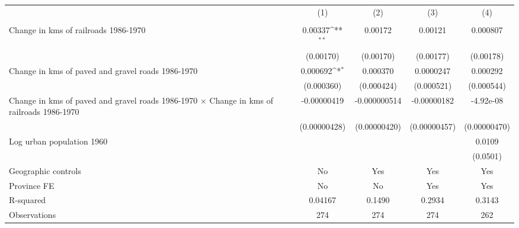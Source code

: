 {
\def\sym#1{\ifmmode^{#1}\else\(^{#1}\)\fi}
\begin{tabular}{l*{4}{c}}
\hline\hline
                &\multicolumn{1}{c}{(1)}&\multicolumn{1}{c}{(2)}&\multicolumn{1}{c}{(3)}&\multicolumn{1}{c}{(4)}\\
                &\multicolumn{1}{c}{}&\multicolumn{1}{c}{}&\multicolumn{1}{c}{}&\multicolumn{1}{c}{}\\
\hline
Change in kms of railroads 1986-1970&  0.00337\sym{**} &  0.00172         &  0.00121         & 0.000807         \\
                &(0.00170)         &(0.00170)         &(0.00177)         &(0.00178)         \\
[1em]
Change in kms of paved and gravel roads 1986-1970& 0.000692\sym{*}  & 0.000370         &0.0000247         & 0.000292         \\
                &(0.000360)         &(0.000424)         &(0.000521)         &(0.000544)         \\
[1em]
Change in kms of paved and gravel roads 1986-1970 $\times$ Change in kms of railroads 1986-1970&-0.00000419         &-0.000000514         &-0.00000182         &-4.92e-08         \\
                &(0.00000428)         &(0.00000420)         &(0.00000457)         &(0.00000470)         \\
[1em]
Log urban population 1960&                  &                  &                  &   0.0109         \\
                &                  &                  &                  & (0.0501)         \\
\hline
Geographic controls&       No         &      Yes         &      Yes         &      Yes         \\
Province FE     &       No         &       No         &      Yes         &      Yes         \\
R-squared       &  0.04167         &   0.1490         &   0.2934         &   0.3143         \\
Observations    &      274         &      274         &      274         &      262         \\
\hline\hline
\end{tabular}
}
